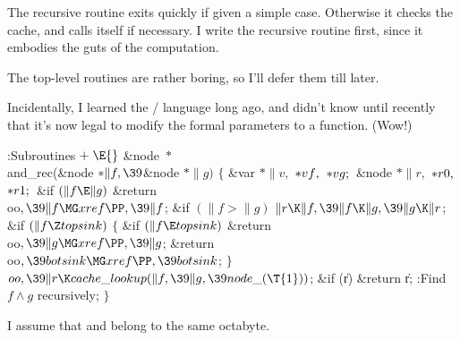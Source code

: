 The recursive routine exits quickly if given a simple case.
Otherwise it checks the cache, and calls itself if necessary.
I write the recursive routine first, since it embodies the guts
of the computation. %

The top-level routines are rather boring, so I'll defer them till later.

Incidentally, I learned the \CEE/ language long ago, and didn't know
until recently that it's now legal to modify the formal parameters
to a function. (Wow!)

\Y\B\4:Subroutines\X${}\mathrel+\E{}$\6
\&{node} ${}{*}{}$\\{and\_rec}(\&{node} ${}{*}\|f,\39{}$\&{node} ${}{*}\|g){}$%
\1\1\2\2\6
${}\{{}$\1\6
\&{var} ${}{*}\|v,{}$ ${}{*}\\{vf},{}$ ${}{*}\\{vg};{}$\6
\&{node} ${}{*}\|r,{}$ ${}{*}\\{r0},{}$ ${}{*}\\{r1};{}$\7
\&{if} ${}(\|f\E\|g){}$\1\5
\&{return} \\{oo}${},\39\|f\MG\\{xref}\PP,\39\|f{}$;\2\6
\&{if} ${}(\|f>\|g){}$\1\5
${}\|r\K\|f,\39\|f\K\|g,\39\|g\K\|r{}$;\2\6
\&{if} ${}(\|f\Z\\{topsink}){}$\5
${}\{{}$\1\6
\&{if} ${}(\|f\E\\{topsink}){}$\1\5
\&{return} \\{oo}${},\39\|g\MG\\{xref}\PP,\39\|g{}$;\2\6
\&{return} \\{oo}${},\39\\{botsink}\MG\\{xref}\PP,\39\\{botsink}{}$;\6
\4${}\}{}$\2\6
${}\\{oo},\39\|r\K\\{cache\_lookup}(\|f,\39\|g,\39\\{node\_}(\T{1})){}$;\6
\&{if} (\|r)\1\5
\&{return} \|r;\2\6
:Find $f\land g$ recursively\X;\6
\4${}\}{}$\2\par
\fi

I assume that  and  belong to the
same octabyte.

